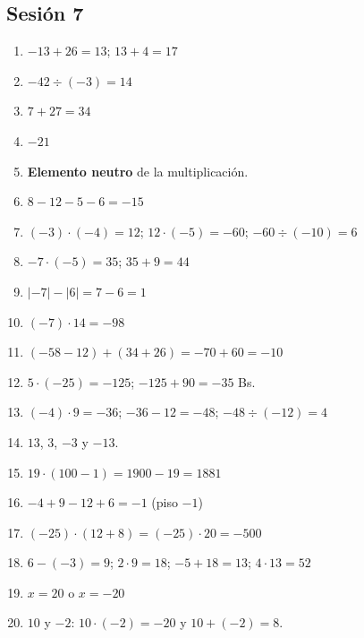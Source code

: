 \documentclass[12pt, letterpaper]{article}
\begin{document}
\subsection*{Sesión 7}
\begin{enumerate}[leftmargin=*, label=\textbf{\arabic*.}]
  \item $-13 + 26 = 13$; $13 + 4 = 17$
  \item $-42 \div (-3) = 14$
  \item $7 + 27 = 34$
  \item $-21$
  \item \textbf{Elemento neutro} de la multiplicación.
  \item $8 - 12 - 5 - 6 = -15$
  \item $(-3) \cdot (-4) = 12$; $12 \cdot (-5) = -60$; $-60 \div (-10) = 6$
  \item $-7 \cdot (-5) = 35$; $35 + 9 = 44$
  \item $|-7| - |6| = 7 - 6 = 1$
  \item $(-7) \cdot 14 = -98$
  \item $(-58 - 12) + (34 + 26) = -70 + 60 = -10$
  \item $5 \cdot (-25) = -125$; $-125 + 90 = -35$ Bs.
  \item $(-4) \cdot 9 = -36$; $-36 - 12 = -48$; $-48 \div (-12) = 4$
  \item $13$, $3$, $-3$ y $-13$.
  \item $19 \cdot (100 - 1) = 1900 - 19 = 1881$
  \item $-4 + 9 - 12 + 6 = -1$ (piso $-1$)
  \item $(-25) \cdot (12 + 8) = (-25) \cdot 20 = -500$
  \item $6 - (-3) = 9$; $2 \cdot 9 = 18$; $-5 + 18 = 13$; $4 \cdot 13 = 52$
  \item $x = 20$ o $x = -20$
  \item $10$ y $-2$: $10 \cdot (-2) = -20$ y $10 + (-2) = 8$.
\end{enumerate}
\end{document}
